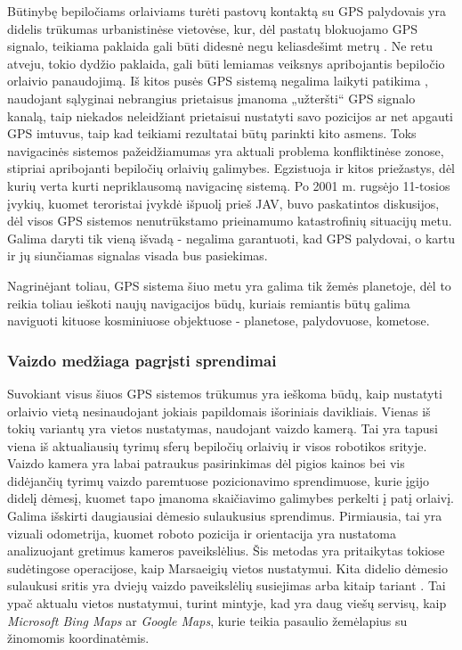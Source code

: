 \documentclass[a4paper,12pt]{article}
\begin{document}
		Būtinybę bepiločiams orlaiviams turėti pastovų kontaktą su GPS palydovais yra didelis trūkumas urbanistinėse vietovėse, kur, dėl pastatų blokuojamo GPS signalo, teikiama paklaida gali būti didesnė negu keliasdešimt metrų \cite{GPSAccuracyInCity}. Ne retu atveju, tokio dydžio paklaida, gali būti lemiamas veiksnys apribojantis bepiločio orlaivio panaudojimą.
		Iš kitos pusės GPS sistemą negalima laikyti patikima \cite{GpsVulnerability}, naudojant sąlyginai nebrangius prietaisus įmanoma „užteršti“ GPS signalo kanalą, taip niekados neleidžiant prietaisui nustatyti savo pozicijos ar net apgauti GPS imtuvus, taip kad teikiami rezultatai būtų parinkti kito asmens. Toks navigacinės sistemos pažeidžiamumas yra aktuali problema konfliktinėse zonose, stipriai apribojanti bepiločių orlaivių galimybes.
		Egzistuoja ir kitos priežastys, dėl kurių verta kurti nepriklausomą navigacinę sistemą. Po 2001 m. rugsėjo 11-tosios įvykių, kuomet teroristai įvykdė išpuolį prieš JAV, buvo paskatintos diskusijos, dėl visos GPS sistemos nenutrūkstamo prieinamumo katastrofinių situacijų metu. Galima daryti tik vieną išvadą - negalima garantuoti, kad GPS palydovai, o kartu ir jų siunčiamas signalas visada bus pasiekimas.
				
		Nagrinėjant toliau, GPS sistema šiuo metu yra galima tik žemės planetoje, dėl to reikia toliau ieškoti naujų navigacijos būdų, kuriais remiantis būtų galima naviguoti kituose kosminiuose objektuose - planetose, palydovuose, kometose.
				
		\subsubsection*{Vaizdo medžiaga pagrįsti sprendimai}

		Suvokiant visus šiuos GPS sistemos trūkumus yra ieškoma būdų, kaip nustatyti orlaivio vietą nesinaudojant jokiais papildomais išoriniais davikliais. Vienas iš tokių variantų yra vietos nustatymas, naudojant vaizdo kamerą. Tai yra tapusi viena iš aktualiausių tyrimų sferų bepiločių orlaivių ir visos robotikos srityje. Vaizdo kamera yra labai patraukus pasirinkimas dėl pigios kainos bei vis didėjančių tyrimų vaizdo paremtuose pozicionavimo sprendimuose, kurie įgijo didelį  dėmesį, kuomet tapo įmanoma skaičiavimo galimybes perkelti į patį orlaivį. 
		Galima išskirti daugiausiai dėmesio sulaukusius sprendimus. Pirmiausia, tai yra vizuali odometrija, kuomet roboto pozicija ir orientacija yra nustatoma analizuojant gretimus kameros paveikslėlius. Šis metodas yra pritaikytas tokiose sudėtingose operacijose, kaip Marsaeigių vietos nustatymui. Kita didelio dėmesio sulaukusi sritis yra dviejų vaizdo paveikslėlių susiejimas arba kitaip tariant . Tai ypač aktualu vietos nustatymui, turint mintyje, kad yra daug viešų servisų, kaip \textit{Microsoft Bing Maps} ar \textit{Google Maps}, kurie teikia pasaulio žemėlapius su žinomomis koordinatėmis.
		
\end{document}
